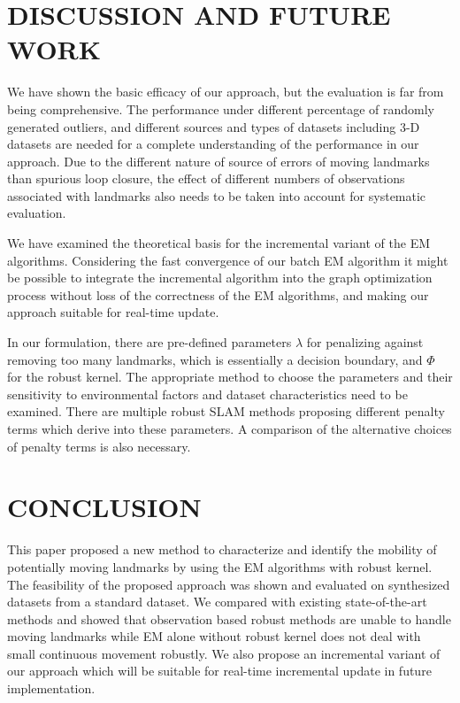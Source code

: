 \section{DISCUSSION AND FUTURE WORK}

We have shown the basic efficacy of our approach, but the evaluation is far from being comprehensive. The performance under different percentage of randomly generated outliers, and different sources and types of datasets including 3-D datasets are needed for a complete understanding of the performance in our approach. Due to the different nature of source of errors of moving landmarks than spurious loop closure, the effect of different numbers of observations associated with landmarks also needs to be taken into account for systematic evaluation.

We have examined the theoretical basis for the incremental variant of the EM algorithms. Considering the fast convergence of our batch EM algorithm it might be possible to integrate the incremental algorithm into the graph optimization process without loss of the correctness of the EM algorithms, and making our approach suitable for real-time update.

In our formulation, there are pre-defined parameters $\lambda$ for penalizing against removing too many landmarks, which is essentially a decision boundary, and $\Phi$ for the robust kernel. The appropriate method to choose the parameters and their sensitivity to environmental factors and dataset characteristics need to be examined. There are multiple robust SLAM methods proposing different penalty terms which derive into these parameters. A comparison of the alternative choices of penalty terms is also necessary.

\section{CONCLUSION}

This paper proposed a new method to characterize and identify the mobility of potentially moving landmarks by using the EM algorithms with robust kernel. The feasibility of the proposed approach was shown and evaluated on synthesized datasets from a standard dataset. We compared with existing state-of-the-art methods and showed that observation based robust methods are unable to handle moving landmarks while EM alone without robust kernel does not deal with small continuous movement robustly. We also propose an incremental variant of our approach which will be suitable for real-time incremental update in future implementation.

